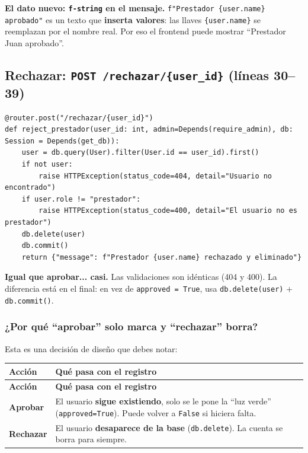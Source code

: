 \documentclass[11pt,a4paper]{article}
\begin{document}
\textbf{El dato nuevo: \texttt{f-string} en el mensaje.} \texttt{f"Prestador \{user.name\}
aprobado"} es un texto que \textbf{inserta valores}: las llaves \texttt{\{user.name\}} se
reemplazan por el nombre real. Por eso el frontend puede mostrar ``Prestador Juan aprobado''.

\subsection{Rechazar: \texttt{POST /rechazar/\{user\_id\}} (líneas 30--39)}

\begin{lstlisting}
@router.post("/rechazar/{user_id}")
def reject_prestador(user_id: int, admin=Depends(require_admin), db: Session = Depends(get_db)):
    user = db.query(User).filter(User.id == user_id).first()
    if not user:
        raise HTTPException(status_code=404, detail="Usuario no encontrado")
    if user.role != "prestador":
        raise HTTPException(status_code=400, detail="El usuario no es prestador")
    db.delete(user)
    db.commit()
    return {"message": f"Prestador {user.name} rechazado y eliminado"}
\end{lstlisting}

\textbf{Igual que aprobar... casi.} Las validaciones son idénticas (404 y 400). La diferencia
está en el final: en vez de \texttt{approved = True}, usa \texttt{db.delete(user)} +
\texttt{db.commit()}.

\subsubsection{¿Por qué ``aprobar'' solo marca y ``rechazar'' borra?}

Esta es una decisión de diseño que debes notar:
\begin{center}
{\small
\setlength{\tabcolsep}{4pt}
\begin{longtable}{@{}>{\raggedright\arraybackslash}p{3.5cm}>{\raggedright\arraybackslash}p{11.2cm}@{}}
\toprule
\textbf{Acción} & \textbf{Qué pasa con el registro} \\
\midrule
\endfirsthead
\toprule
\textbf{Acción} & \textbf{Qué pasa con el registro} \\
\midrule
\endhead
\textbf{Aprobar} & El usuario \textbf{sigue existiendo}, solo se le pone la ``luz verde''
(\texttt{approved=True}). Puede volver a \texttt{False} si hiciera falta. \\
\textbf{Rechazar} & El usuario \textbf{desaparece de la base} (\texttt{db.delete}). La cuenta
se borra para siempre. \\
\bottomrule
\end{longtable}
}
\end{center}
\end{document}
